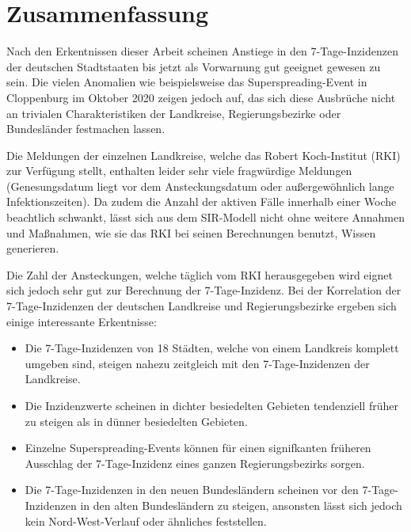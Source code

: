 \chapter{Zusammenfassung}\label{chap:Zusammenfassun}
Nach den Erkentnissen dieser Arbeit scheinen Anstiege in den 7-Tage-Inzidenzen der deutschen Stadtstaaten bis jetzt als Vorwarnung gut geeignet gewesen zu sein. Die vielen Anomalien wie beispielsweise das Superspreading-Event in Cloppenburg im Oktober 2020 zeigen jedoch auf, das sich diese Ausbrüche nicht an trivialen Charakteristiken der Landkreise, Regierungsbezirke oder Bundesländer festmachen lassen.

Die Meldungen der einzelnen Landkreise, welche das Robert Koch-Institut (RKI) zur Verfügung stellt, enthalten leider sehr viele fragwürdige Meldungen (Genesungsdatum liegt vor dem Ansteckungsdatum oder außergewöhnlich lange Infektionszeiten). Da zudem die Anzahl der aktiven Fälle innerhalb einer Woche beachtlich schwankt, lässt sich aus dem SIR-Modell nicht ohne weitere Annahmen und Maßnahmen, wie sie das RKI bei seinen Berechnungen benutzt, Wissen generieren.

Die Zahl der Ansteckungen, welche täglich vom RKI herausgegeben wird eignet sich jedoch sehr gut zur Berechnung der 7-Tage-Inzidenz.
Bei der Korrelation der 7-Tage-Inzidenzen der deutschen Landkreise und Regierungsbezirke ergeben sich einige interessante Erkentnisse:
\begin{itemize}
    \item Die 7-Tage-Inzidenzen von 18 Städten, welche von einem Landkreis komplett umgeben sind, steigen nahezu zeitgleich mit den 7-Tage-Inzidenzen der Landkreise.
    \item Die Inzidenzwerte scheinen in dichter besiedelten Gebieten tendenziell früher zu steigen als in dünner besiedelten Gebieten.
    \item Einzelne Superspreading-Events können für einen signifkanten früheren Ausschlag der 7-Tage-Inzidenz eines ganzen Regierungsbezirks sorgen.
    \item Die 7-Tage-Inzidenzen in den neuen Bundesländern scheinen vor den 7-Tage-Inzidenzen in den alten Bundesländern zu steigen, ansonsten lässt sich jedoch kein Nord-West-Verlauf oder ähnliches feststellen.
\end{itemize}